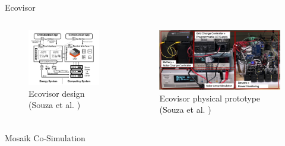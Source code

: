 \begin{frame}{Ecovisor}
    \begin{columns}
        \begin{figure}
            \centering
            \includegraphics[width=\textwidth]{../../ecovisor_design}
            \caption{Ecovisor design (Souza et al. \cite{souza2022})}
            \label{fig:ecovisor_design}
        \end{figure}
        \begin{figure}
            \centering
            \includegraphics[width=\textwidth]{../../ecovisor_testbed}
            \caption{Ecovisor physical prototype (Souza et al. \cite{souza2022})}
            \label{fig:ecovisor_testbed}
        \end{figure}
    \end{columns}
\end{frame}

\begin{frame}{Mosaik Co-Simulation}
\end{frame}
